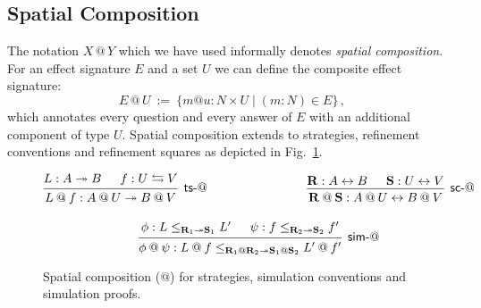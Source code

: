 
\subsection{Spatial Composition} \label{sec:scomp} %

The notation $X \mathbin@ Y$ which we have used informally
denotes \emph{spatial composition}.
For an effect signature $E$ and a set $U$
we can define the composite effect signature:
\[
  E \mathbin@ U \: := \:
    \{ m @ u : N \times U \mid (m : N) \in E \}
  \,,
\]
which annotates every question and every answer of $E$
with an additional component of type $U$.
Spatial composition extends to strategies,
refinement conventions and refinement squares
as depicted in Fig.~\ref{fig:xcomp}.

\begin{figure} %
  \begin{gather*}
    \begin{prooftree}
      \hypo{L : A \twoheadrightarrow B}
      \hypo{f : U \lensarrow V}
      \infer2[\kw{ts}-$\mathbin@$]{
        L \mathbin@ f : A \mathbin@ U \twoheadrightarrow B \mathbin@ V
      }
    \end{prooftree}
    \hspace{8em}
    \begin{prooftree}
      \hypo{\mathbf{R} : A \leftrightarrow B}
      \hypo{\mathbf{S} : U \leftrightarrow V}
      \infer2[\kw{sc}-$\mathbin@$]{
        \mathbf{R} \mathbin@ \mathbf{S} : A \mathbin@ U \leftrightarrow B \mathbin@ V
      }
    \end{prooftree}
    \\[1em]
    \begin{prooftree}
      \hypo{\phi: L \le_{\mathbf{R}_1 \twoheadrightarrow \mathbf{S}_1} L'}
      \hypo{\psi: f \le_{\mathbf{R}_2 \twoheadrightarrow \mathbf{S}_2} f'}
      \infer2[\kw{sim}-$\mathbin@$]{\phi \mathbin@ \psi :
	L \mathbin@ f
        \le_{\mathbf{R}_1 \mathbin@ \mathbf{R}_2 \twoheadrightarrow
             \mathbf{S}_1 \mathbin@ \mathbf{S}_2}
	L' \mathbin@ f'}
    \end{prooftree}
  \end{gather*}
  \caption{Spatial composition ($\mathbin@$) for strategies,
    simulation conventions and simulation proofs.}
  \label{fig:xcomp}
\end{figure}

